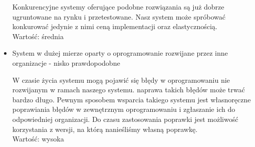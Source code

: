 \documentclass[../wstep.tex]{subfiles}
\begin{document}
\begin{itemize}
          Konkurencyjne systemy oferujące podobne rozwiązania są już dobrze ugruntowane na rynku i przetestowane. Nasz system może spróbować konkurować jedynie z nimi ceną implementacji oraz elastycznością.\\
          Wartość: średnia
    \item System w dużej mierze oparty o oprogramowanie rozwijane przez inne organizacje - nisko prawdopodobne

          W czasie życia systemu mogą pojawić się błędy w oprogramowaniu nie rozwijanym w ramach naszego systemu. naprawa takich błędów może trwać bardzo długo. Pewnym sposobem wsparcia takiego systemu jest własnoręczne poprawiania błędów w zewnętrznym oprogramowaniu i zgłaszanie ich do odpowiedniej organizacji. Do czasu zastosowania poprawki jest możliwość korzystania z wersji, na którą nanieśliśmy własną poprawkę.\\
          Wartość: wysoka

\end{itemize}
\end{document}
